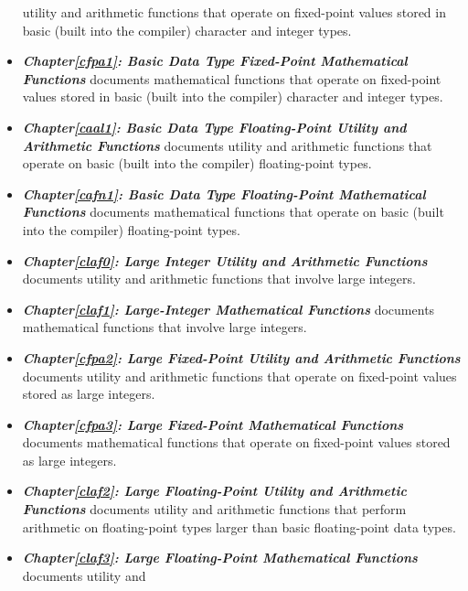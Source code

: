 \begin{itemize}
      utility and arithmetic functions that operate on fixed-point values stored 
      in basic (built into the compiler) character and integer types.  
\item \emph{\textbf{Chapter\postchapterwordnonstretchable{}\ref{cfpa1}: 
      Basic Data Type Fixed-Point Mathematical Functions}} documents 
      mathematical functions that operate on fixed-point values stored in basic 
      (built into the compiler) character and integer types.  
\item \emph{\textbf{Chapter\postchapterwordnonstretchable{}\ref{caal1}: 
      Basic Data Type Floating-Point Utility and Arithmetic Functions}} 
      documents utility and arithmetic functions that operate on basic (built 
      into the compiler) floating-point types.  
\item \emph{\textbf{Chapter\postchapterwordnonstretchable{}\ref{cafn1}: 
      Basic Data Type Floating-Point Mathematical Functions}} documents 
      mathematical functions that operate on basic (built into the compiler) 
      floating-point types.  
\item \emph{\textbf{Chapter\postchapterwordnonstretchable{}\ref{claf0}: 
      Large Integer Utility and Arithmetic Functions}} documents utility and 
      arithmetic functions that involve large integers.  
\item \emph{\textbf{Chapter\postchapterwordnonstretchable{}\ref{claf1}: 
      Large-Integer Mathematical Functions}} documents mathematical functions 
      that involve large integers.  
\item \emph{\textbf{Chapter\postchapterwordnonstretchable{}\ref{cfpa2}: 
      Large Fixed-Point Utility and Arithmetic Functions}} documents utility and 
      arithmetic functions that operate on fixed-point values stored as large 
      integers.  
\item \emph{\textbf{Chapter\postchapterwordnonstretchable{}\ref{cfpa3}: 
      Large Fixed-Point Mathematical Functions}} documents mathematical 
      functions that operate on fixed-point values stored as large integers.  
\item \emph{\textbf{Chapter\postchapterwordnonstretchable{}\ref{claf2}: 
      Large Floating-Point Utility and Arithmetic Functions}} documents utility 
      and arithmetic functions that perform arithmetic on floating-point types 
      larger than basic floating-point data types.  
\item \emph{\textbf{Chapter\postchapterwordnonstretchable{}\ref{claf3}: 
      Large Floating-Point Mathematical Functions}} documents utility and 

\end{itemize}
